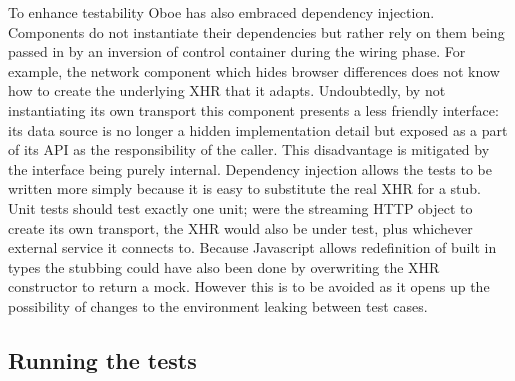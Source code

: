 \documentclass[12pt, ]{article}
\begin{document}
To enhance testability Oboe has also embraced dependency injection.
Components do not instantiate their dependencies but rather rely on them
being passed in by an inversion of control container during the wiring
phase. For example, the network component which hides browser
differences does not know how to create the underlying XHR that it
adapts. Undoubtedly, by not instantiating its own transport this
component presents a less friendly interface: its data source is no
longer a hidden implementation detail but exposed as a part of its API
as the responsibility of the caller. This disadvantage is mitigated by
the interface being purely internal. Dependency injection allows the
tests to be written more simply because it is easy to substitute the
real XHR for a stub. Unit tests should test exactly one unit; were the
streaming HTTP object to create its own transport, the XHR would also be
under test, plus whichever external service it connects to. Because
Javascript allows redefinition of built in types the stubbing could have
also been done by overwriting the XHR constructor to return a mock.
However this is to be avoided as it opens up the possibility of changes
to the environment leaking between test cases.

\subsection{Running the tests}\label{running-the-tests}
\end{document}
